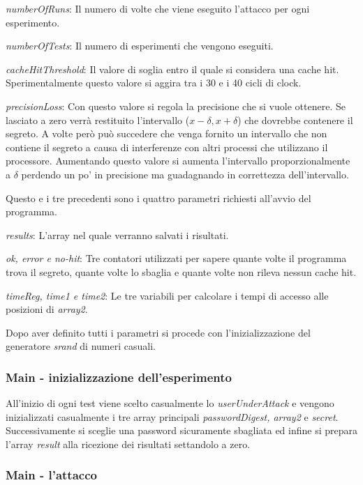 					\emph{numberOfRuns}: Il numero di volte che viene eseguito l'attacco per ogni esperimento.
					
					\emph{numberOfTests}: Il numero di esperimenti che vengono eseguiti.
					
					\emph{cacheHitThreshold}: Il valore di soglia entro il quale si considera una cache hit. Sperimentalmente questo valore si aggira tra i 30 e i 40 cicli di clock.
					
					\emph{precisionLoss}: Con questo valore si regola la precisione che si vuole ottenere. Se lasciato a zero verrà restituito l'intervallo ($x-\delta, x+\delta$) che dovrebbe contenere il segreto. A volte però può succedere che venga fornito un intervallo che non contiene il segreto a causa di interferenze con altri processi che utilizzano il processore. Aumentando questo valore si aumenta l'intervallo proporzionalmente a $\delta$ perdendo un po' in precisione ma guadagnando in correttezza dell'intervallo.
					
					Questo e i tre precedenti sono i quattro parametri richiesti all'avvio del programma.
					
					\emph{results}: L'array nel quale verranno salvati i risultati.
					
					\emph{ok, error e no-hit}: Tre contatori utilizzati per sapere quante volte il programma trova il segreto, quante volte lo sbaglia e quante volte non rileva nessun cache hit.
					
					\emph{timeReg, time1 e time2}: Le tre variabili per calcolare i tempi di accesso alle posizioni di \emph{array2}.
			
				Dopo aver definito tutti i parametri si procede con l'inizializzazione del generatore \emph{srand} di numeri casuali.
				
				\subsubsection{Main - inizializzazione dell'esperimento}
				
				All'inizio di ogni test viene scelto casualmente lo \emph{userUnderAttack} e vengono inizializzati casualmente i tre array principali \emph{passwordDigest, array2} e \emph{secret}. Successivamente si sceglie una password sicuramente sbagliata ed infine si prepara l'array \emph{result} alla ricezione dei risultati settandolo a zero.
				
				\subsubsection{Main - l'attacco}
				
